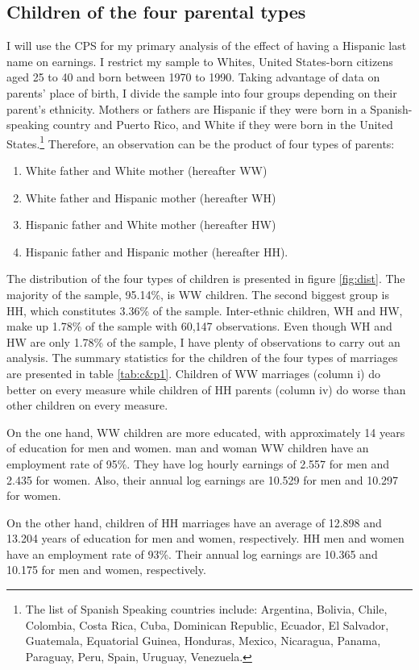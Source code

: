\documentclass[12pt, fullpage]{article}
\begin{document}
\subsection{Children of the four parental types}
I will use the CPS for my primary analysis of the effect of having a Hispanic last name on earnings. I restrict my sample to Whites, United States-born citizens aged 25 to 40 and born between 1970 to 1990. Taking advantage of data on parents' place of birth, I divide the sample into four groups depending on their parent's ethnicity. Mothers or fathers are Hispanic if they were born in a Spanish-speaking country and Puerto Rico, and White if they were born in the United States.\footnote{The list of Spanish Speaking countries include: Argentina, Bolivia, Chile, Colombia, Costa Rica, Cuba, Dominican Republic, Ecuador, El Salvador, Guatemala, Equatorial Guinea, Honduras, Mexico, Nicaragua, Panama, Paraguay, Peru, Spain, Uruguay, Venezuela.} Therefore, an observation can be the product of four types of parents: 
\begin{enumerate}
\item White father and White mother (hereafter WW) 
\item White father and Hispanic mother (hereafter WH)
\item Hispanic father and White mother (hereafter HW)
\item Hispanic father and Hispanic mother (hereafter HH).
\end{enumerate}
The distribution of the four types of children is presented in figure \ref{fig:dist}. The majority of the sample, 95.14\%, is WW children. The second biggest group is HH, which constitutes 3.36\% of the sample. Inter-ethnic children, WH and HW, make up 1.78\% of the sample with 60,147 observations. Even though WH and HW are only 1.78\% of the sample, I have plenty of observations to carry out an analysis. The summary statistics for the children of the four types of marriages are presented in table \ref{tab:c&p1}. Children of WW marriages (column i) do better on every measure while children of HH parents (column iv) do worse than other children on every measure. 


On the one hand, WW children are more educated, with approximately 14 years of education for men and women. man and woman WW children have an employment rate of 95\%. They have log hourly earnings of 2.557 for men and 2.435 for women. Also, their annual log earnings are 10.529 for men and 10.297 for women.

On the other hand, children of HH marriages have an average of 12.898 and 13.204 years of education for men and women, respectively. HH men and women have an employment rate of 93\%. Their annual log earnings are 10.365 and 10.175 for men and women, respectively. 
\end{document}

